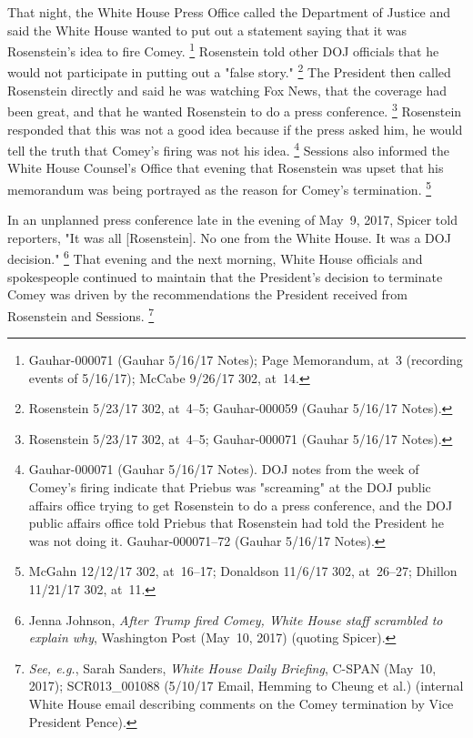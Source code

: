That night, the White House Press Office called the Department of Justice and said the White House wanted to put out a statement saying that it was Rosenstein's idea to fire Comey.%
\footnote{Gauhar-000071 (Gauhar 5/16/17 Notes);
Page Memorandum, at~3 (recording events of 5/16/17);
McCabe 9/26/17 302, at~14.}
Rosenstein told other DOJ officials that he would not participate in putting out a "false story."%
\footnote{Rosenstein 5/23/17 302, at~4--5;
Gauhar-000059 (Gauhar 5/16/17 Notes).}
The President then called Rosenstein directly and said he was watching Fox News, that the coverage had been great, and that he wanted Rosenstein to do a press conference.%
\footnote{Rosenstein 5/23/17 302, at~4--5;
Gauhar-000071 (Gauhar 5/16/17 Notes).}
Rosenstein responded that this was not a good idea because if the press asked him, he would tell the truth that Comey's firing was not his idea.%
\footnote{Gauhar-000071 (Gauhar 5/16/17 Notes).
DOJ notes from the week of Comey's firing indicate that Priebus was "screaming" at the DOJ public affairs office trying to get Rosenstein to do a press conference, and the DOJ public affairs office told Priebus that Rosenstein had told the President he was not doing it.
Gauhar-000071--72 (Gauhar 5/16/17 Notes).}
Sessions also informed the White House Counsel's Office that evening that Rosenstein was upset that his memorandum was being portrayed as the reason for Comey's termination.%
\footnote{McGahn 12/12/17 302, at~16--17;
Donaldson 11/6/17 302, at~26--27;
Dhillon 11/21/17 302, at~11.}

In an unplanned press conference late in the evening of May~9, 2017, Spicer told reporters, "It was all [Rosenstein].
No one from the White House.
It was a DOJ decision."%
\footnote{Jenna Johnson, \textit{After Trump fired Comey, White House staff scrambled to explain why}, Washington Post (May~10, 2017) (quoting Spicer).}
That evening and the next morning, White House officials and spokespeople continued to maintain that the President's decision to terminate Comey was driven by the recommendations the President received from Rosenstein and Sessions.%
\footnote{\textit{See, e.g.}, Sarah Sanders, \textit{White House Daily Briefing}, C-SPAN (May~10, 2017);
SCR013\_001088 (5/10/17 Email, Hemming to Cheung et al.) (internal White House email describing comments on the Comey termination by Vice President Pence).}


